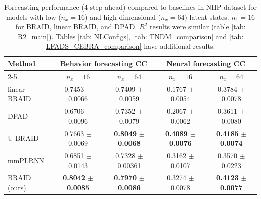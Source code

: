 \documentclass{article} %
\newcommand{\ourmethod}{BRAID}
\newcommand{\ourmethodlinear}{linear \ourmethod}
\newcommand{\ourmethodunsup}{U-\ourmethod}
\begin{document}


\begin{table}[t]
\baselineskip
\caption{Forecasting performance (4-step-ahead) compared to baselines in NHP dataset for models with low ($n_x\!=\!16$) and high-dimensional ($n_x\!=\!64$) latent states. $n_1\!=\!16$ for \ourmethod{}, \ourmethodlinear{}, and DPAD. $R^2$ results were similar (table \ref{tab: R2_main}). Tables \ref{tab: NLConfigs}, \ref{tab: TNDM_comparison} and \ref{tab: LFADS_CEBRA_comparison} have additional results.}
\label{tab: mainTable}
\begin{center}
\begin{tabular}{l|c|c|c|c}
\multirow{2}{*}{\textbf{Method}} & \multicolumn{2}{c|}{\textbf{Behavior forecasting CC}} & \multicolumn{2}{c}{\textbf{Neural forecasting CC}} \\ \cline{2-5} & $n_x=16$ & $n_x=64$ & $n_x=16$ & $n_x=64$ \\
\midrule
\ourmethodlinear{} & 0.7453 \(\pm\) 0.0066 & 0.7409 \(\pm\) 0.0059 & 0.1767 \(\pm\) 0.0054 & 0.3784 \(\pm\) 0.0078\\
DPAD & 0.6706 \(\pm\) 0.0096 & 0.7352 \(\pm\) 0.0079 &  0.2067 \(\pm\) 0.0062 & 0.3611 \(\pm\) 0.0080\\
\ourmethodunsup{} & 0.7663 \(\pm\) 0.0069 & \textbf{0.8049} \(\pm\) \textbf{0.0068} & \textbf{0.4089 \(\pm\) 0.0076} & \textbf{0.4185} \(\pm\) \textbf{0.0074}\\
mmPLRNN &  0.6851 \(\pm\) 0.0143 & 0.7328 \(\pm\) 0.00361 &  0.3162 \(\pm\) 0.0107 & 0.3570 \(\pm\) 0.0223\\
\midrule
\ourmethod{} (ours) & \textbf{0.8042 \(\pm\) 0.0085} & \textbf{0.7970} \(\pm\) \textbf{0.0086} & 0.3274 \(\pm\) 0.0078 & \textbf{0.4123} \(\pm\) \textbf{0.0077}\\
\end{tabular}
\end{center}
\end{table}
\baselineskip
\end{document}
